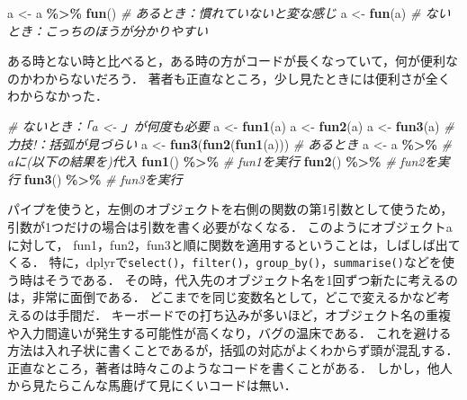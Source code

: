 \documentclass[
]{article}
\newenvironment{Shaded}{\begin{snugshade}}{\end{snugshade}}
\newcommand{\CommentTok}[1]{\textcolor[rgb]{0.56,0.35,0.01}{\textit{#1}}}
\newcommand{\FunctionTok}[1]{\textcolor[rgb]{0.13,0.29,0.53}{\textbf{#1}}}
\newcommand{\NormalTok}[1]{#1}
\newcommand{\OtherTok}[1]{\textcolor[rgb]{0.56,0.35,0.01}{#1}}
\newcommand{\SpecialCharTok}[1]{\textcolor[rgb]{0.81,0.36,0.00}{\textbf{#1}}}
\begin{document}
\begin{Shaded}
\begin{Highlighting}[]
\NormalTok{a }\OtherTok{\textless{}{-}}\NormalTok{ a }\SpecialCharTok{\%\textgreater{}\%} \FunctionTok{fun}\NormalTok{() }\CommentTok{\# あるとき：慣れていないと変な感じ}
\NormalTok{a }\OtherTok{\textless{}{-}} \FunctionTok{fun}\NormalTok{(a)      }\CommentTok{\# ないとき：こっちのほうが分かりやすい}
\end{Highlighting}
\end{Shaded}

ある時とない時と比べると，ある時の方がコードが長くなっていて，何が便利なのかわからないだろう．
著者も正直なところ，少し見たときには便利さが全くわからなかった．

\begin{Shaded}
\begin{Highlighting}[]
  \CommentTok{\# ないとき：「a \textless{}{-} 」が何度も必要}
\NormalTok{a }\OtherTok{\textless{}{-}} \FunctionTok{fun1}\NormalTok{(a)}
\NormalTok{a }\OtherTok{\textless{}{-}} \FunctionTok{fun2}\NormalTok{(a)}
\NormalTok{a }\OtherTok{\textless{}{-}} \FunctionTok{fun3}\NormalTok{(a)}
  \CommentTok{\# 力技!：括弧が見づらい}
\NormalTok{a }\OtherTok{\textless{}{-}} \FunctionTok{fun3}\NormalTok{(}\FunctionTok{fun2}\NormalTok{(}\FunctionTok{fun1}\NormalTok{(a)))}
  \CommentTok{\# あるとき}
\NormalTok{a }\OtherTok{\textless{}{-}}\NormalTok{ a }\SpecialCharTok{\%\textgreater{}\%}   \CommentTok{\# aに(以下の結果を)代入}
  \FunctionTok{fun1}\NormalTok{() }\SpecialCharTok{\%\textgreater{}\%} \CommentTok{\# fun1を実行}
  \FunctionTok{fun2}\NormalTok{() }\SpecialCharTok{\%\textgreater{}\%} \CommentTok{\# fun2を実行}
  \FunctionTok{fun3}\NormalTok{() }\SpecialCharTok{\%\textgreater{}\%} \CommentTok{\# fun3を実行}
\end{Highlighting}
\end{Shaded}

パイプを使うと，左側のオブジェクトを右側の関数の第1引数として使うため，引数が1つだけの場合は引数を書く必要がなくなる．
このようにオブジェクトaに対して， fun1，fun2，fun3と順に関数を適用するということは，しばしば出てくる．
特に，dplyrで\texttt{select()}，\texttt{filter()}，\texttt{group\_by()}，\texttt{summarise()}などを使う時はそうである．
その時，代入先のオブジェクト名を1回ずつ新たに考えるのは，非常に面倒である．
どこまでを同じ変数名として，どこで変えるかなど考えるのは手間だ．
キーボードでの打ち込みが多いほど，オブジェクト名の重複や入力間違いが発生する可能性が高くなり，バグの温床である．
これを避ける方法は入れ子状に書くことであるが，括弧の対応がよくわからず頭が混乱する．
正直なところ，著者は時々このようなコードを書くことがある．
しかし，他人から見たらこんな馬鹿げて見にくいコードは無い．
\end{document}
